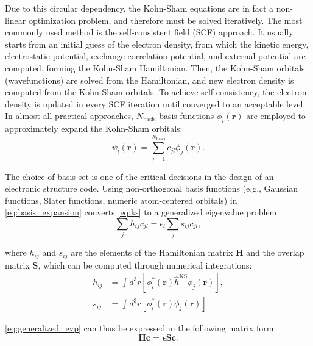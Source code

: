 \documentclass{report}
\begin{document}
Due to this circular dependency, the Kohn-Sham equations are in fact a non-linear optimization problem, and therefore must be solved iteratively.  The most commonly used method is the self-consistent field (SCF) approach.  It usually starts from an initial guess of the electron density, from which the kinetic energy, electrostatic potential, exchange-correlation potential, and external potential are computed, forming the Kohn-Sham Hamiltonian.  Then, the Kohn-Sham orbitals (wavefunctions) are solved from the Hamiltonian, and new electron density is computed from the Kohn-Sham orbitals.  To achieve self-consistency, the electron density is updated in every SCF iteration until converged to an acceptable level.\\

In almost all practical approaches, $N_\text{basis}$ basis functions ${\phi_i(\boldsymbol{r})}$ are employed to approximately expand the Kohn-Sham orbitals:\\
\begin{equation}
\label{eq:basis_expansion}
\psi_l(\boldsymbol{r}) = \sum_{j=1}^{N_\text{basis}} c_{jl} \phi_j(\boldsymbol{r}) .
\end{equation}

\noindent The choice of basis set is one of the critical decisions in the design of an electronic structure code.  Using non-orthogonal basis functions (e.g., Gaussian functions, Slater functions, numeric atom-centered orbitals) in \ref{eq:basis_expansion} converts \ref{eq:ks} to a generalized eigenvalue problem\\
\begin{equation}
\label{eq:generalized_evp}
\sum_j h_{ij} c_{jl} = \epsilon_l \sum_j s_{ij} c_{jl} ,
\end{equation}

\noindent where $h_{ij}$ and $s_{ij}$ are the elements of the Hamiltonian matrix $\boldsymbol{H}$ and the overlap matrix $\boldsymbol{S}$, which can be computed through numerical integrations:\\
\begin{equation}
\label{eq:ham_ovlp_integration}
\begin{split}
h_{ij} & = \int d^3 r [\phi_i^*(\boldsymbol{r}) \hat{h}^\text{KS} \phi_j(\boldsymbol{r})] ,\\
s_{ij} & = \int d^3 r [\phi_i^*(\boldsymbol{r}) \phi_j(\boldsymbol{r})] .
\end{split}
\end{equation}

\ref{eq:generalized_evp} can thus be expressed in the following matrix form:\\
\begin{equation}
\label{eq:generalized_evp_matrix}
\boldsymbol{H} \boldsymbol{c} = \boldsymbol{\epsilon} \boldsymbol{S} \boldsymbol{c} .
\end{equation}
\end{document}
